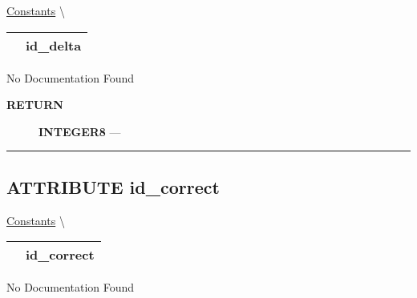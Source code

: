 \hypertarget{ecldoc:logisticregression.constants.id_delta}{}
\hspace{0pt} \hyperlink{ecldoc:LogisticRegression.Constants}{Constants} \textbackslash 

{\renewcommand{\arraystretch}{1.5}
\begin{tabularx}{\textwidth}{|>{\raggedright\arraybackslash}l|X|}
\hline
\hspace{0pt}\mytexttt{\color{red} } & \textbf{id\_delta} \\
\hline
\end{tabularx}
}

\par





No Documentation Found








\par
\begin{description}
\item [\colorbox{tagtype}{\color{white} \textbf{\textsf{RETURN}}}] \textbf{INTEGER8} --- 
\end{description}




\rule{\linewidth}{0.5pt}
\subsection*{\textsf{\colorbox{headtoc}{\color{white} ATTRIBUTE}
id\_correct}}

\hypertarget{ecldoc:logisticregression.constants.id_correct}{}
\hspace{0pt} \hyperlink{ecldoc:LogisticRegression.Constants}{Constants} \textbackslash 

{\renewcommand{\arraystretch}{1.5}
\begin{tabularx}{\textwidth}{|>{\raggedright\arraybackslash}l|X|}
\hline
\hspace{0pt}\mytexttt{\color{red} } & \textbf{id\_correct} \\
\hline
\end{tabularx}
}

\par





No Documentation Found








